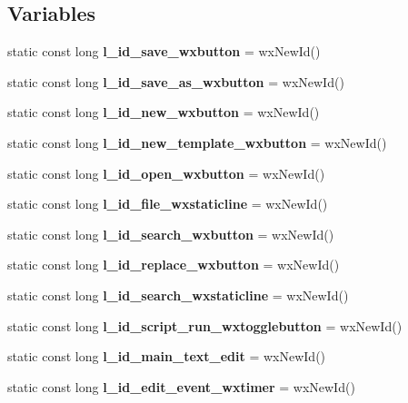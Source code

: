 \subsection*{Variables}
\begin{DoxyCompactItemize}
\item 
static const long \textbf{ l\+\_\+id\+\_\+save\+\_\+wxbutton} = wx\+New\+Id()
\item 
\mbox{\label{group___editor_ga284d0279229729f59343bed79e2cc465}} 
static const long {\bfseries l\+\_\+id\+\_\+save\+\_\+as\+\_\+wxbutton} = wx\+New\+Id()
\item 
\mbox{\label{group___editor_ga21e7bf11b35bfc90d70cfc7cd27f5cff}} 
static const long {\bfseries l\+\_\+id\+\_\+new\+\_\+wxbutton} = wx\+New\+Id()
\item 
\mbox{\label{group___editor_gafc6a4341616d7bf19fffa42ea1b04be7}} 
static const long {\bfseries l\+\_\+id\+\_\+new\+\_\+template\+\_\+wxbutton} = wx\+New\+Id()
\item 
\mbox{\label{group___editor_gaff46ff902fd09a652b2d66bce0cccd15}} 
static const long {\bfseries l\+\_\+id\+\_\+open\+\_\+wxbutton} = wx\+New\+Id()
\item 
\mbox{\label{group___editor_gaebc030d86850559ddf32f6336e67b354}} 
static const long {\bfseries l\+\_\+id\+\_\+file\+\_\+wxstaticline} = wx\+New\+Id()
\item 
\mbox{\label{group___editor_ga279ca27ce48455db61dae83b35394114}} 
static const long {\bfseries l\+\_\+id\+\_\+search\+\_\+wxbutton} = wx\+New\+Id()
\item 
\mbox{\label{group___editor_ga4918849684ac7bfd736ad0ee73aca38d}} 
static const long {\bfseries l\+\_\+id\+\_\+replace\+\_\+wxbutton} = wx\+New\+Id()
\item 
\mbox{\label{group___editor_gadbaaaeec284ff44110a6c2eadd1a3413}} 
static const long {\bfseries l\+\_\+id\+\_\+search\+\_\+wxstaticline} = wx\+New\+Id()
\item 
\mbox{\label{group___editor_gac92c5e98a0714456c7f9e6bfa755414a}} 
static const long {\bfseries l\+\_\+id\+\_\+script\+\_\+run\+\_\+wxtogglebutton} = wx\+New\+Id()
\item 
\mbox{\label{group___editor_gaf27057b31557e61d15fd980a12382f66}} 
static const long {\bfseries l\+\_\+id\+\_\+main\+\_\+text\+\_\+edit} = wx\+New\+Id()
\item 
\mbox{\label{group___editor_gab70552035844395dd050a8fe0e7e5825}} 
static const long {\bfseries l\+\_\+id\+\_\+edit\+\_\+event\+\_\+wxtimer} = wx\+New\+Id()
\end{DoxyCompactItemize}


